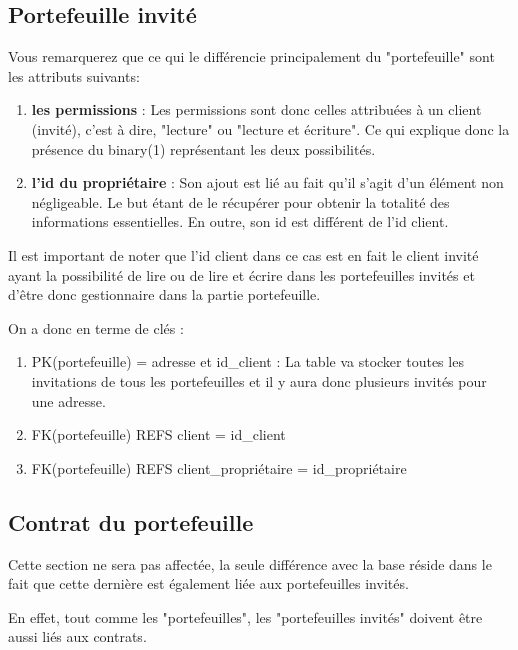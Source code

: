 \newpage
\subsection{Portefeuille invité}
\begin{flushleft}
Vous remarquerez que ce qui le différencie principalement du "portefeuille" sont les attributs suivants:
\end{flushleft}
\begin{enumerate}
\item \textbf{les permissions }: \newline
Les permissions sont donc celles attribuées à un client (invité), c'est à dire, "lecture" ou "lecture et écriture". \newline
Ce qui explique donc la présence du binary(1) représentant les deux possibilités.

\item \textbf{l'id du propriétaire} :\newline
Son ajout est lié au fait qu'il s'agit d'un élément non négligeable. \newline 
Le but étant de le récupérer pour obtenir la totalité des informations essentielles.\newline
En outre, son id est différent de l'id client.
\end{enumerate}

\begin{flushleft}
Il est important de noter que l'id client dans ce cas est en fait le client invité ayant la possibilité de lire ou de lire et écrire dans les portefeuilles invités et d'être donc gestionnaire dans la partie portefeuille.
\end{flushleft}

\begin{flushleft}
On a donc en terme de clés :
\end{flushleft}

\begin{enumerate}
\item PK(portefeuille) = adresse et id\_client :\newline
La table va stocker toutes les invitations de tous les portefeuilles et il y aura donc plusieurs invités pour une adresse.
\item FK(portefeuille) REFS client = id\_client
\item FK(portefeuille) REFS client\_propriétaire = id\_propriétaire
\end{enumerate}

\subsection{Contrat du portefeuille}
\begin{flushleft}
Cette section ne sera pas affectée, la seule différence avec la base réside dans le fait que cette dernière est également liée aux portefeuilles invités.
\end{flushleft}
\begin{flushleft}
En effet, tout comme les "portefeuilles", les "portefeuilles invités" doivent être aussi liés aux contrats.
\end{flushleft}

